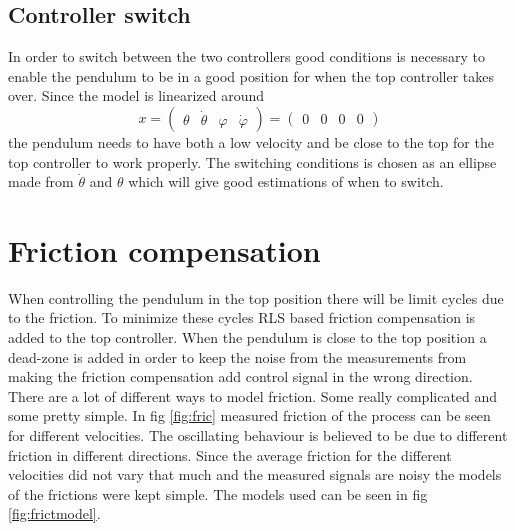 \documentclass[10pt,a4paper]{article}
\begin{document}
\subsection{Controller switch}
In order to switch between the two controllers good conditions is necessary to enable the pendulum to be in a good position for when the top controller takes over. Since the model is linearized around 
$$x =
\begin{pmatrix}
\theta & \dot\theta & \varphi & \dot\varphi
\end{pmatrix} = 
\begin{pmatrix}
0 & 0 & 0 & 0
\end{pmatrix}$$
the pendulum needs to have both a low velocity and be close to the top for the top controller to work properly. The switching conditions is chosen as an ellipse made from $\dot\theta$ and $\theta$ which will give good estimations of when to switch. 


\section{Friction compensation}
When controlling the pendulum in the top position there will be limit cycles due to the friction. To minimize these cycles RLS based friction compensation is added to the top controller. When the pendulum is close to the top position a dead-zone is added in order to keep the noise from the measurements from making the friction compensation add control signal in the wrong direction. There are a lot of different ways to model friction. Some really complicated and some pretty simple. In fig \ref{fig:fric} measured friction of the process can be seen for different velocities. The oscillating behaviour is believed to be due to different friction in different directions. Since the average friction for the different velocities did not vary that much and the measured signals are noisy the models of the frictions were kept simple. The models used can be seen in fig \ref{fig:frictmodel}. 
\end{document}
